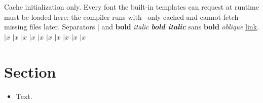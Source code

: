 \documentclass[letterpaper,11pt]{article}
\begin{document}
Cache initialization only. Every font the built-in templates can request at runtime must be
loaded here: the compiler runs with --only-cached and cannot fetch missing files later.
Separators $|$ and \textbf{bold} \textit{italic} \textbf{\textit{bold italic}}
\textsf{sans \textbf{bold} \textit{oblique}} \href{https://example.com}{link}.
{\tiny $|x$} {\scriptsize $|x$} {\footnotesize $|x$} {\small $|x$} {\normalsize $|x$}
{\large $|x$} {\Large $|x$} {\LARGE $|x$} {\huge $|x$} {\Huge $|x$}
\section*{Section}
\begin{itemize}\item Text.\end{itemize}
\end{document}
